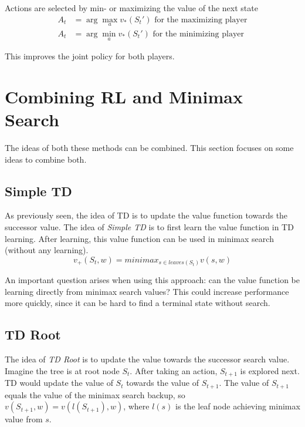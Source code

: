 Actions are selected by min- or maximizing the value of the next state
\begin{equation*}
	\begin{aligned}
		A_t & = \arg\max_a v_*(S_t') \text{ for the maximizing player}\\
		A_t & = \arg\min_a v_*(S_t') \text{ for the minimizing player}
	\end{aligned}
\end{equation*}

This improves the joint policy for both players.

\section{Combining RL and Minimax Search}

The ideas of both these methods can be combined. This section focuses on some ideas to combine both.

\subsection{Simple TD}

As previously seen, the idea of TD is to update the value function towards the successor value. The idea of \textit{Simple TD} is to first learn the value function in TD learning. After learning, this value function can be used in minimax search (without any learning). 
\begin{equation*}
	v_+(S_t, w) = minimax_{s \in leaves(S_t)} v(s, w)
\end{equation*}

An important question arises when using this approach: can the value function be learning directly from minimax search values? This could increase performance more quickly, since it can be hard to find a terminal state without search.

\subsection{TD Root}

The idea of \textit{TD Root} is to update the value towards the successor search value. Imagine the tree is at root node $S_t$. After taking an action, $S_{t+1}$ is explored next. TD would update the value of $S_t$ towards the value of $S_{t+1}$. The value of $S_{t+1}$ equals the value of the minimax search backup, so $v(S_{t+1}, w) = v(l(S_{t+1}), w)$, where $l(s)$ is the leaf node achieving minimax value from $s$.

